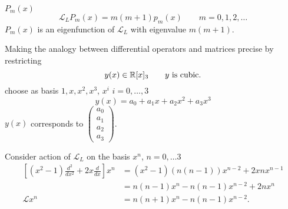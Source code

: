 \documentclass[10pt, a4paper]{article}
\begin{document}
\begin{example}
    $P_m(x)$
    \[
    \mathcal{L}_LP_m(x) = m(m + 1)p_m(x)\qquad m = 0, 1, 2, \dotsc
    \]
    $P_m(x)$ is an eigenfunction of $\mathcal{L}_L$ with eigenvalue $m(m + 1)$.
\end{example}

Making the analogy between differential operators and matrices precise by restricting
\[
y(x) \in \mathbb{R}[x]_3\qquad y\text{ is cubic}.
\]
choose as basis $1, x, x ^ 2, x ^ 3$,
$x ^ i$
$i = 0, \dotsc, 3$
\[
y(x) = a_0 + a_1x + a_2x ^ 2 + a_3x ^ 3
\]
$y(x)$ corresponds to $\begin{pmatrix}
    a_0 \\ a_1 \\ a_2 \\ a_3
\end{pmatrix}$.

Consider action of $\mathcal{L}_L$ on the basis $x ^ n$,
$n = 0, \dotsc 3$
\begin{align*}
    \left[(x ^ 2 - 1)\frac{d ^ 2}{dx ^ 2} + 2x\frac{d}{dx}\right]x ^ n &= (x ^ 2 - 1)(n(n - 1))x ^ {n - 2} + 2xnx ^ {n - 1} \\
    &= n(n - 1)x ^ n - n(n - 1)x ^ {n - 2} + 2nx ^ n \\
    \mathcal{L}x ^ n &= n(n + 1)x ^ n - n(n - 1)x ^ {n - 2}.
\end{align*}
\end{document}
